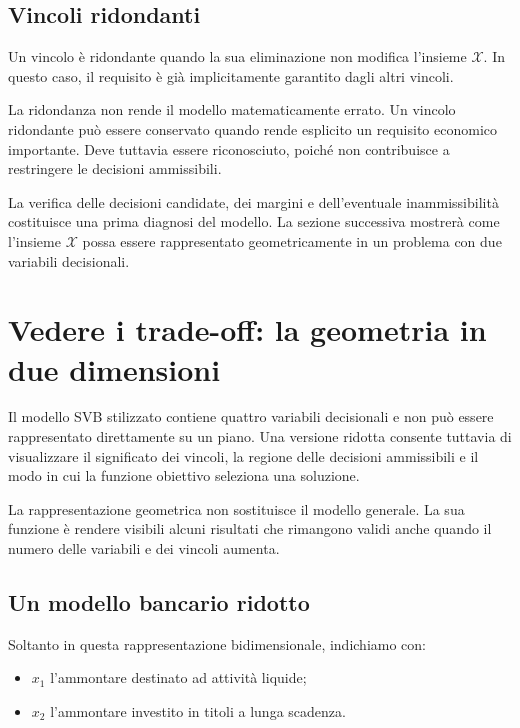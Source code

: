 \subsection{Vincoli ridondanti}

Un vincolo \`e ridondante quando la sua eliminazione non modifica l'insieme
\(\mathcal{X}\). In questo caso, il requisito \`e gi\`a implicitamente
garantito dagli altri vincoli.

La ridondanza non rende il modello matematicamente errato. Un vincolo
ridondante pu\`o essere conservato quando rende esplicito un requisito
economico importante. Deve tuttavia essere riconosciuto, poich\'e non
contribuisce a restringere le decisioni ammissibili.

La verifica delle decisioni candidate, dei margini e dell'eventuale
inammissibilit\`a costituisce una prima diagnosi del modello. La sezione
successiva mostrer\`a come l'insieme \(\mathcal{X}\) possa essere rappresentato
geometricamente in un problema con due variabili decisionali.

\section{Vedere i trade-off: la geometria in due dimensioni}

\label{sec:cap11-geometria}

Il modello SVB stilizzato contiene quattro variabili decisionali e non pu\`o
essere rappresentato direttamente su un piano. Una versione ridotta consente
tuttavia di visualizzare il significato dei vincoli, la regione delle
decisioni ammissibili e il modo in cui la funzione obiettivo seleziona una
soluzione.

La rappresentazione geometrica non sostituisce il modello generale. La sua
funzione \`e rendere visibili alcuni risultati che rimangono validi anche
quando il numero delle variabili e dei vincoli aumenta.

\subsection{Un modello bancario ridotto}

Soltanto in questa rappresentazione bidimensionale, indichiamo con:

\begin{itemize}

\item $x_1$ l'ammontare destinato ad attivit\`a liquide;

\item $x_2$ l'ammontare investito in titoli a lunga scadenza.

\end{itemize}

